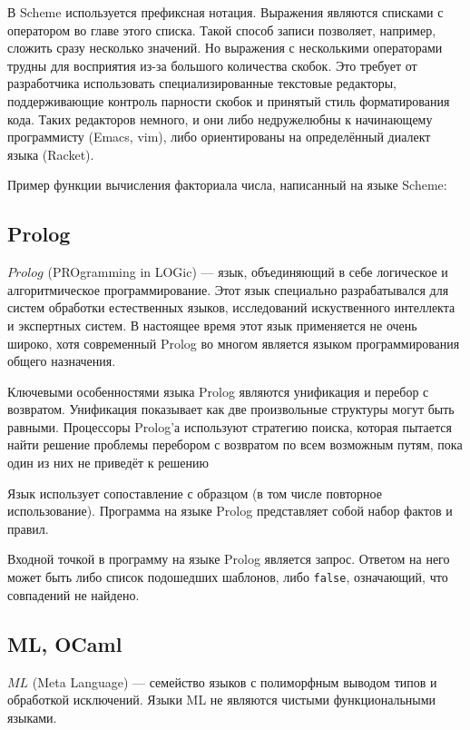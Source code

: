         В Scheme используется префиксная нотация.
        Выражения являются списками с оператором во главе этого списка.
        Такой способ записи позволяет, например, сложить сразу несколько значений.
        Но выражения с несколькими операторами трудны для восприятия из-за большого количества скобок.
        Это требует от разработчика использовать специализированные текстовые редакторы, поддерживающие контроль парности скобок и принятый стиль форматирования кода.
        Таких редакторов немного, и они либо недружелюбны к начинающему программисту (Emacs, vim), либо ориентированы на определённый диалект языка (Racket).

        Пример функции вычисления факториала числа, написанный на языке Scheme:

        
    \subsection{Prolog}
        $Prolog$ (PROgramming in LOGic) --- язык, объединяющий в себе логическое и алгоритмическое программирование.
        Этот язык специально разрабатывался для систем обработки естественных языков, исследований искуственного интеллекта и экспертных систем.
        В настоящее время этот язык применяется не очень широко\cite{TIOBE}, хотя современный Prolog во многом является языком программирования общего назначения.

        Ключевыми особенностями языка Prolog являются унификация и перебор с возвратом.
        Унификация показывает как две произвольные структуры могут быть равными.
        Процессоры Prolog'а используют стратегию поиска, которая пытается найти решение проблемы перебором с возвратом по всем возможным путям, пока один из них не приведёт к решению\cite{prolog}

        Язык использует сопоставление с образцом (в том числе повторное использование).
        Программа на языке Prolog представляет собой набор фактов и правил.

        Входной точкой в программу на языке Prolog является запрос.
        Ответом на него может быть либо список подошедших шаблонов, либо \verb!false!, означающий, что совпадений не найдено.

    \subsection{ML, OCaml}
        $ML$ (Meta Language) --- семейство языков с полиморфным выводом типов и обработкой исключений.
        Языки ML не являются чистыми функциональными языками.
        
